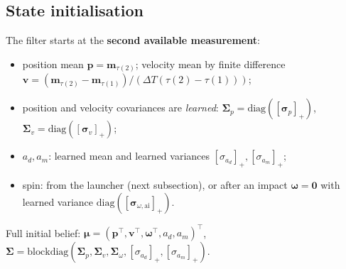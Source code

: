 \documentclass[11pt,a4paper]{article}
\newcommand{\vv}{\mathbf{v}}
\newcommand{\pp}{\mathbf{p}}
\newcommand{\mm}{\mathbf{m}}
\newcommand{\ww}{\boldsymbol{\omega}}
\newcommand{\mmu}{\boldsymbol{\mu}}
\newcommand{\SSigma}{\boldsymbol{\Sigma}}
\newcommand{\splus}[1]{[#1]_+}
\begin{document}
\subsection{State initialisation}
The filter starts at the \textbf{second available measurement}:
\begin{itemize}
\item position mean $\pp=\mm_{\tau(2)}$; velocity mean by finite difference $\vv=(\mm_{\tau(2)}-\mm_{\tau(1)})/(\Delta T(\tau(2)-\tau(1)))$;
\item position and velocity covariances are \emph{learned}: $\SSigma_p=\mathrm{diag}(\splus{\boldsymbol\sigma_p})$, $\SSigma_v=\mathrm{diag}(\splus{\boldsymbol\sigma_v})$;
\item $a_d,a_m$: learned mean and learned variances $\splus{\sigma_{a_d}},\splus{\sigma_{a_m}}$;
\item spin: from the launcher (next subsection), or after an impact $\ww=\mathbf 0$ with learned variance $\mathrm{diag}(\splus{\boldsymbol\sigma_{\omega,\text{ai}}})$.
\end{itemize}
Full initial belief: $\mmu=(\pp^\top,\vv^\top,\ww^\top,a_d,a_m)^\top$, $\SSigma=\mathrm{blockdiag}(\SSigma_p,\SSigma_v,\SSigma_\omega,\splus{\sigma_{a_d}},\splus{\sigma_{a_m}})$.
\end{document}
